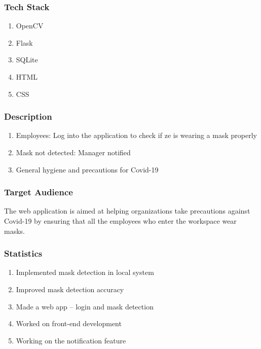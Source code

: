 \documentclass[14pt]{beamer}
\begin{document}
\begin{frame}
    \frametitle{Tech Stack}
    \begin{enumerate}
        \item OpenCV
        \item Flask
        \item SQLite
        \item HTML
        \item CSS
    \end{enumerate}
\end{frame} 

\begin{frame}
    \frametitle{Description}
    \begin{enumerate}

        \item Employees: Log into the application to check if ze is wearing a mask properly

        \item Mask not detected: Manager notified

        \item General hygiene and precautions for Covid-19
    \end{enumerate}
\end{frame}


\begin{frame}
    \frametitle{Target Audience}
    The web application is  aimed at helping organizations take precautions against Covid-19 by ensuring that all the employees who enter the workspace wear masks.
\end{frame}

\begin{frame}
    \frametitle{Statistics}
    \begin{enumerate}
        \item Implemented mask detection in local system
        \item Improved mask detection accuracy
        \item Made a web app -- login and mask detection
        \item Worked on front-end development
        \item Working on the notification feature
    \end{enumerate}
\end{frame}
\end{document}
